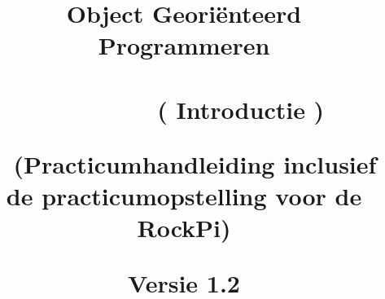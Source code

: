 \documentclass[12pt,openright,twoside]{report}
\date{}
\title{
	
	{\vspace{-4cm}}
	
	{\hspace{-20pt}\begin{bfseries}\LARGE{\color{black}Object Georiënteerd Programmeren  \\ ~ \\ ~~~~~~~~ ( Introductie )} \end{bfseries}  } 
	\newline ~ \newline
	\small{(Practicumhandleiding inclusief de practicumopstelling voor de RockPi)}
	\ThisCenterWallPaper{0.8}{figuren/frontRock.png}
	
	{Versie 1.2}
	
	{\vspace{12cm}}	
	{\color{white}  
		\raggedleft  \par}
	
}
\begin{document}
	
	
	\maketitle
	
	\tableofcontents
	
	\let\cleardoublepage\clearpage
	
	
	
	
	
	
	
	
	\begin{comment}
	\maketitle
	
	
	\tableofcontents
	
	\let\cleardoublepage\clearpage
	\let\cleardoublepage\clearpage
	
	
%	
	\let\cleardoublepage\relax
%	

	
	
	
	
	
	\end{comment}
\end{document}
